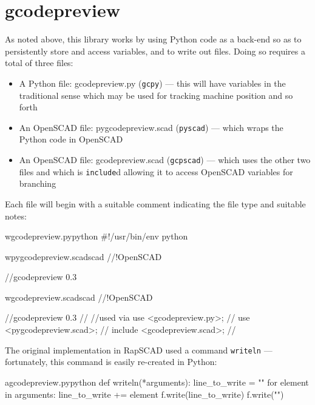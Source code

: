 \documentclass{ltxdoc}
\begin{document}
\section{gcodepreview}

As noted above, this library works by using Python code as a back-end so as to persistently
store and access variables, and to write out files. Doing so requires a total of three files:

\begin{itemize}
\item A Python file: gcodepreview.py (\texttt{gcpy}) --- this will have variables in the 
      traditional sense which may be used for tracking machine position and so forth
\item An OpenSCAD file: pygcodepreview.scad (\texttt{pyscad}) --- which wraps the Python code 
      in OpenSCAD
\item An OpenSCAD file: gcodepreview.scad (\texttt{gcpscad}) --- which uses the other two files 
      and which is \texttt{include}d allowing it to access OpenSCAD variables for branching   
\end{itemize}
 
Each file will begin with a suitable comment indicating the file type and suitable notes:

\begin{writecode}{w}{gcodepreview.py}{python}
#!/usr/bin/env python

\end{writecode}
\addtocounter{gcpy}{3}

\begin{writecode}{w}{pygcodepreview.scad}{scad}
//!OpenSCAD
 
//gcodepreview 0.3

\end{writecode}
\addtocounter{pyscad}{5}

\begin{writecode}{w}{gcodepreview.scad}{scad}
//!OpenSCAD
 
//gcodepreview 0.3
//
//used via use <gcodepreview.py>;
//         use <pygcodepreview.scad>;
//         include <gcodepreview.scad>;
//

\end{writecode}
\addtocounter{gcpscad}{10}

The original implementation in RapSCAD used a command \texttt{writeln} 
--- fortunately, this command is easily re-created in Python:

\lstset{firstnumber=\thegcpy}
\begin{writecode}{a}{gcodepreview.py}{python}
def writeln(*arguments):
    line_to_write = ""
    for element in arguments:
        line_to_write += element
    f.write(line_to_write)
    f.write("\n")
    
\end{writecode}
\addtocounter{gcpy}{7}
\end{document}

